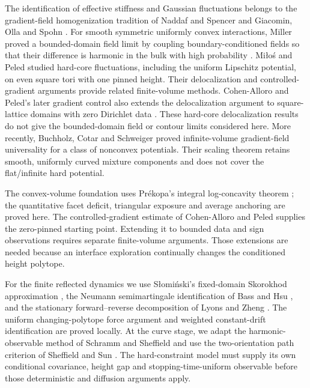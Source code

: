\documentclass[11pt]{article}
\theoremstyle{definition}
\theoremstyle{remark}
\numberwithin{equation}{section}
\begin{document}
The identification of effective stiffness and Gaussian fluctuations
belongs to the gradient-field homogenization tradition of Naddaf and
Spencer \cite{NaddafSpencer} and Giacomin, Olla and Spohn
\cite{GiacominOllaSpohn}. For smooth symmetric uniformly convex interactions,
Miller proved a bounded-domain field limit by coupling boundary-conditioned
fields so that their difference is harmonic in the bulk with high probability
\cite{MillerField}. Mi\l o\'s and Peled \cite{MilosPeled}
studied hard-core fluctuations, including the uniform Lipschitz
potential, on even square tori with one pinned height. Their
delocalization and controlled-gradient arguments provide related
finite-volume methods. Cohen-Alloro and Peled's later gradient control
also extends the delocalization argument to square-lattice domains with
zero Dirichlet data \cite[Section~6]{CAP}. These hard-core delocalization
results do not give the
bounded-domain field or contour limits considered here. More recently, Buchholz, Cotar and
Schweiger \cite{BuchholzCotarSchweiger} proved infinite-volume
gradient-field universality for a class of nonconvex potentials.
Their scaling theorem retains smooth, uniformly curved mixture
components and does not cover the flat/infinite hard potential.

The convex-volume foundation uses Pr\'ekopa's integral log-concavity
theorem \cite{Prekopa}; the quantitative facet deficit, triangular
exposure and average anchoring are proved here. The controlled-gradient
estimate of Cohen-Alloro and Peled \cite{CAP} supplies the zero-pinned
starting point. Extending it to bounded data and sign observations
requires separate finite-volume arguments. Those extensions are needed
because an interface exploration continually changes the conditioned
height polytope.

For the finite reflected dynamics we use S\l omi\'nski's fixed-domain
Skorokhod approximation \cite{Slominski}, the Neumann semimartingale
identification of Bass and Hsu \cite{BassHsu}, and the stationary
forward--reverse decomposition of Lyons and Zheng \cite{LyonsZheng}.
The uniform changing-polytope force argument and weighted constant-drift
identification are proved locally. At the curve stage, we adapt the
harmonic-observable method of Schramm and Sheffield \cite{SSdiscrete}
and use the two-orientation path criterion of Sheffield and Sun
\cite{SSun}. The hard-constraint model must supply its own conditional
covariance, height gap and stopping-time-uniform observable before
those deterministic and diffusion arguments apply.
\end{document}
